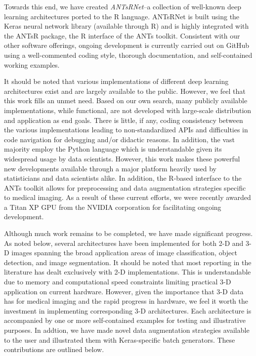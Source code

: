 \documentclass[11pt,]{article}
\begin{document}
Towards this end, we have created \emph{ANTsRNet}--a collection of
well-known deep learning architectures ported to the R language.
ANTsRNet is built using the Keras neural network library (available
through R) and is highly integrated with the ANTsR package, the R
interface of the ANTs toolkit. Consistent with our other software
offerings, ongoing development is currently carried out on GitHub using
a well-commented coding style, thorough documentation, and
self-contained working examples.

It should be noted that various implementations of different deep
learning architectures exist and are largely available to the public.
However, we feel that this work fills an unmet need. Based on our own
search, many publicly available implementations, while functional, are
not developed with large-scale distribution and application as end
goals. There is little, if any, coding consistency between the various
implementations leading to non-standardized APIs and difficulties in
code navigation for debugging and/or didactic reasons. In addition, the
vast majority employ the Python language which is understandable given
its widespread usage by data scientists. However, this work makes these
powerful new developments available through a major platform heavily
used by statisticians and data scientists alike. In addition, the
R-based interface to the ANTs toolkit allows for preprocessing and data
augmentation strategies specific to medical imaging. As a result of
these current efforts, we were recently awarded a Titan XP GPU from the
NVIDIA corporation for facilitating ongoing development.

Although much work remains to be completed, we have made significant
progress. As noted below, several architectures have been implemented
for both 2-D and 3-D images spanning the broad application areas of
image classification, object detection, and image segmentation. It
should be noted that most reporting in the literature has dealt
exclusively with 2-D implementations. This is understandable due to
memory and computational speed constraints limiting practical 3-D
application on current hardware. However, given the importance that 3-D
data has for medical imaging and the rapid progress in hardware, we feel
it worth the investment in implementing corresponding 3-D architectures.
Each architecture is accompanied by one or more self-contained examples
for testing and illustrative purposes. In addtion, we have made novel
data augmentation strategies available to the user and illustrated them
with Keras-specific batch generators. These contributions are outlined
below.
\end{document}
